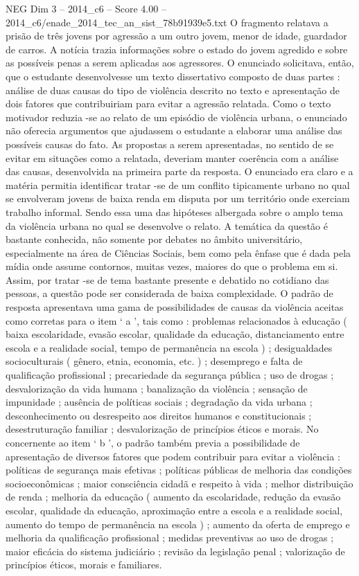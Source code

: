 \begin{textsample}{NEG Dim 3 – 2014\_c6 – Score 4.00 – 2014\_c6/enade\_2014\_tec\_an\_sist\_78b91939e5.txt}
O fragmento relatava a prisão de três jovens por agressão a um outro jovem, menor de idade, guardador de carros.
A notícia trazia informações sobre o estado do jovem agredido e sobre as possíveis penas a serem aplicadas aos agressores.
O enunciado solicitava, então, que o estudante desenvolvesse um texto dissertativo composto de duas partes : análise de duas causas do tipo de violência descrito no texto e apresentação de dois fatores que contribuiriam para evitar a agressão relatada.
Como o texto motivador reduzia -se ao relato de um episódio de violência urbana, o enunciado não oferecia argumentos que ajudassem o estudante a elaborar uma análise das possíveis causas do fato.
As propostas a serem apresentadas, no sentido de se evitar em situações como a relatada, deveriam manter coerência com a análise das causas, desenvolvida na primeira parte da resposta.
O enunciado era claro e a matéria permitia identificar tratar -se de um conflito tipicamente urbano no qual se envolveram jovens de baixa renda em disputa por um território onde exerciam trabalho informal.
Sendo essa uma das hipóteses albergada sobre o amplo tema da violência urbana no qual se desenvolve o relato.
A temática da questão é bastante conhecida, não somente por debates no âmbito universitário, especialmente na área de Ciências Sociais, bem como pela ênfase que é dada pela mídia onde assume contornos, muitas vezes, maiores do que o problema em si.
Assim, por tratar -se de tema bastante presente e debatido no cotidiano das pessoas, a questão pode ser considerada de baixa complexidade.
O padrão de resposta apresentava uma gama de possibilidades de causas da violência aceitas como corretas para o item ‘ a ’, tais como : problemas relacionados à educação ( baixa escolaridade, evasão escolar, qualidade da educação, distanciamento entre escola e a realidade social, tempo de permanência na escola ) ; desigualdades socioculturais ( gênero, etnia, economia, etc. ) ; desemprego e falta de qualificação profissional ; precariedade da segurança pública ; uso de drogas ; desvalorização da vida humana ; banalização da violência ; sensação de impunidade ; ausência de políticas sociais ; degradação da vida urbana ; desconhecimento ou desrespeito aos direitos humanos e constitucionais ; desestruturação familiar ; desvalorização de princípios éticos e morais.
No concernente ao item ‘ b ’, o padrão também previa a possibilidade de apresentação de diversos fatores que podem contribuir para evitar a violência : políticas de segurança mais efetivas ; políticas públicas de melhoria das condições socioeconômicas ; maior consciência cidadã e respeito à vida ; melhor distribuição de renda ; melhoria da educação ( aumento da escolaridade, redução da evasão escolar, qualidade da educação, aproximação entre a escola e a realidade social, aumento do tempo de permanência na escola ) ; aumento da oferta de emprego e melhoria da qualificação profissional ; medidas preventivas ao uso de drogas ; maior eficácia do sistema judiciário ; revisão da legislação penal ; valorização de princípios éticos, morais e familiares.

\end{textsample}
